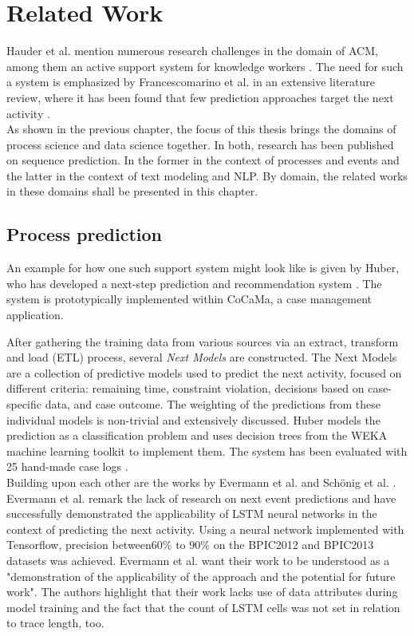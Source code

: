 \chapter{Related Work}\label{sec:related-work}
Hauder et al. mention numerous research challenges in the domain of ACM, among them an active support system for knowledge workers \cite{hauder2014}.
The need for such a system is emphasized by Francescomarino et al. in an extensive literature review, where it has been found that few prediction approaches target the next activity \cite{francescomarino2018}.\\

As shown in the previous chapter, the focus of this thesis brings the domains of process science and data science together. In both, research has been published on sequence prediction. In the former in the context of processes and events and the latter in the context of text modeling and NLP. By domain, the related works in these domains shall be presented in this chapter.

\section{Process prediction}
An example for how one such support system \cite{hauder2014} might look like is given by Huber, who has developed a next-step prediction and recommendation system  \cite{huber2015}. The system is prototypically implemented within CoCaMa, a case management application.

After gathering the training data from various sources via an extract, transform and load (ETL) process, several \textit{Next Models} are constructed. The Next Models are a collection of predictive models used to predict the next activity, focused on different criteria: remaining time, constraint violation, decisions based on case-specific data, and case outcome. The weighting of the predictions from these individual models is non-trivial and extensively discussed. Huber models the prediction as a classification problem and uses decision trees from the WEKA \cite{web:weka} machine learning toolkit to implement them. The system has been evaluated with 25 hand-made case logs \cite{huber2015}.\\

Building upon each other are the works by Evermann et al. \cite{evermann2016} and Schönig et al. \cite{schoenig2018}. Evermann et al. remark the lack of research on next event predictions and have successfully demonstrated the applicability of LSTM neural networks in the context of predicting the next activity. Using a neural network implemented with Tensorflow, precision between$60\%$ to $90\%$ on the BPIC2012 and BPIC2013 datasets was achieved. Evermann et al. want their work to be understood as a "demonstration of the applicability of the approach and the potential for future work". The authors highlight that their work lacks use of data attributes during model training and the fact that the count of LSTM cells was not set in relation to trace length, too.

